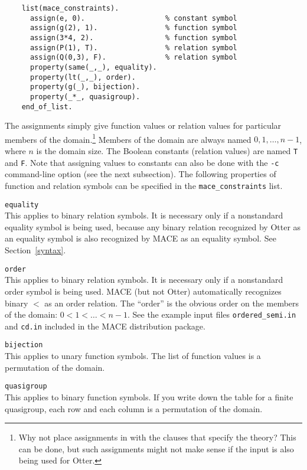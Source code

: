 \documentclass[11pt]{article}
\begin{document}
\begin{small}
\begin{verbatim}
    list(mace_constraints).
      assign(e, 0).                   % constant symbol
      assign(g(2), 1).                % function symbol
      assign(3*4, 2).                 % function symbol
      assign(P(1), T).                % relation symbol
      assign(Q(0,3), F).              % relation symbol
      property(same(_,_), equality).
      property(lt(_,_), order).
      property(g(_), bijection).
      property(_*_, quasigroup).
    end_of_list.
\end{verbatim}
\end{small}
The assignments simply give function values or relation values
for particular members of the domain.\footnote
{
Why not place assignments in with the clauses that specify the theory?
This can be done, but such assignments might not make sense if
the input is also being used for Otter.
}
Members of the domain
are always named $0, 1, \ldots, n-1$, where $n$ is the domain size.
The Boolean constants (relation values) are named \texttt{T} and
\texttt{F}.  Note that assigning values to constants can also
be done with the \texttt{-c} command-line option (see the next subsection).
The following properties of function and relation symbols can be specified
in the \texttt{mace\_constraints} list.
\begin{description}
\item{\texttt{equality}}\\
This applies to binary relation symbols.
It is necessary only if a nonstandard equality symbol is being used,
because any binary relation recognized by Otter as an equality symbol
is also recognized by MACE as an equality symbol.
See Section~\ref{syntax}.
\item{\texttt{order}}\\
This applies to binary relation symbols.
It is necessary only if a nonstandard order symbol is being used.
MACE (but not Otter) automatically recognizes binary $<$ as
an order relation.
The ``order'' is the obvious order on
the members of the domain: $0<1<\ldots<n-1$.
See the example input files
\texttt{ordered\_semi.in} and \texttt{cd.in}
included in the MACE distribution package.
\item{\texttt{bijection}}\\
This applies to unary function symbols.
The list of function values is a permutation of the domain.
\item{\texttt{quasigroup}}\\
This applies to binary function symbols.
If you write down the table for a finite quasigroup,
each row and each column is a permutation of the
domain.
\end{description}
\end{document}
